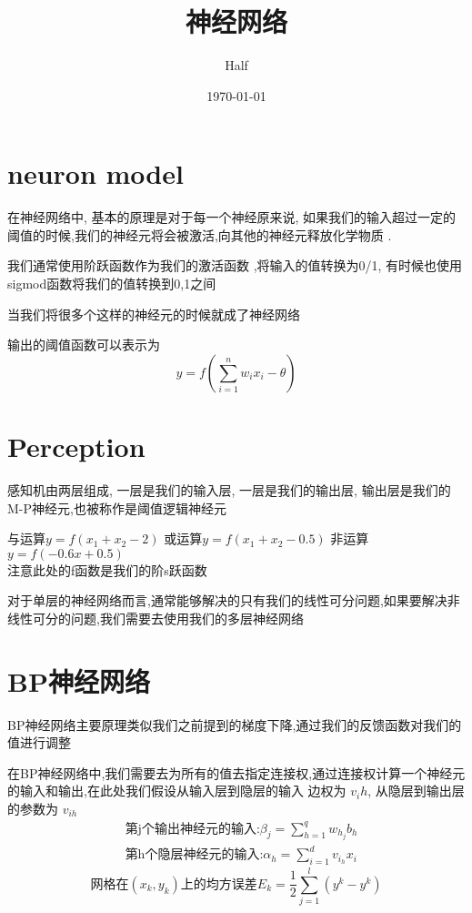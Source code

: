\documentclass[UTF8]{ctexart}
\title{神经网络}
\author{Half}
\date{\today}
\begin{document}
\maketitle
\section{neuron model}
\par
在神经网络中, 基本的原理是对于每一个神经原来说, 如果我们的输入超过一定的阈值的时候,我们的神经元将会被激活,向其他的神经元释放化学物质
.
\par 
我们通常使用阶跃函数作为我们的激活函数 ,将输入的值转换为0/1, 有时候也使用sigmod函数将我们的值转换到0,1之间
\par 
当我们将很多个这样的神经元的时候就成了神经网络
\par 
输出的阈值函数可以表示为
\begin{equation}
    y = f(\sum_{i=1}^n w_ix_i-\theta)
\end{equation}
\section{Perception}
\par 
感知机由两层组成, 一层是我们的输入层, 一层是我们的输出层, 输出层是我们的M-P神经元,也被称作是阈值逻辑神经元
\par 
与运算$y =f(x_1+x_2-2)$
或运算$y = f(x_1+x_2-0.5)$
非运算$y = f(-0.6x+0.5)$\\
注意此处的f函数是我们的阶s跃函数
\par 
对于单层的神经网络而言,通常能够解决的只有我们的线性可分问题,如果要解决非线性可分的问题,我们需要去使用我们的多层神经网络
\section{BP神经网络}
\par 
BP神经网络主要原理类似我们之前提到的梯度下降,通过我们的反馈函数对我们的值进行调整
\par 
在BP神经网络中,我们需要去为所有的值去指定连接权,通过连接权计算一个神经元的输入和输出,在此处我们假设从输入层到隐层的输入
边权为 $v_ih$, 从隐层到输出层的参数为 $v_{ih}$ 
\begin{equation}
    \begin{aligned}
        &\mbox{第j个输出神经元的输入:} \beta_j = \sum_{h=1}^q w_{h_j}b_h\\
        &\mbox{第h个隐层神经元的输入:} \alpha_h = \sum_{i=1}^d v_{i_h}x_i
    \end{aligned}
\end{equation}
\begin{equation}
    \mbox{网格在$(x_k, y_k)$上的均方误差} E_k= \frac{1}{2}\sum_{j=1}^l (y^{k}-y^k)
\end{equation}
\end{document}
